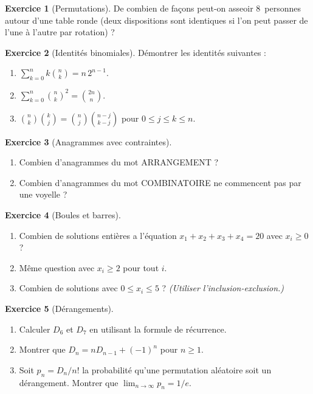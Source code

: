 \documentclass[12pt,a4paper,openany]{book}
\theoremstyle{definition}
\newtheorem{exercice}{Exercice}[chapter]
\theoremstyle{plain}
\theoremstyle{remark}
\begin{document}
\begin{exercice}[Permutations]\label{exo:permutations}
De combien de façons peut-on asseoir 8~personnes autour d'une table ronde
(deux dispositions sont identiques si l'on peut passer de l'une à l'autre
par rotation) ?
\end{exercice}

\begin{exercice}[Identités binomiales]\label{exo:identites-binom}
Démontrer les identités suivantes :
\begin{enumerate}
  \item $\displaystyle\sum_{k=0}^{n} k\binom{n}{k} = n\,2^{n-1}$.
  \item $\displaystyle\sum_{k=0}^{n} \binom{n}{k}^2 = \binom{2n}{n}$.
  \item $\displaystyle\binom{n}{k}\binom{k}{j} = \binom{n}{j}\binom{n-j}{k-j}$
    pour $0 \leq j \leq k \leq n$.
\end{enumerate}
\end{exercice}

\begin{exercice}[Anagrammes avec contraintes]\label{exo:anagrammes}
\begin{enumerate}
  \item Combien d'anagrammes du mot \textsc{ARRANGEMENT} ?
  \item Combien d'anagrammes du mot \textsc{COMBINATOIRE} ne commencent
    pas par une voyelle ?
\end{enumerate}
\end{exercice}

\begin{exercice}[Boules et barres]\label{exo:boules-barres}
\begin{enumerate}
  \item Combien de solutions entières a l'équation $x_1+x_2+x_3+x_4 = 20$
    avec $x_i \geq 0$ ?
  \item Même question avec $x_i \geq 2$ pour tout $i$.
  \item Combien de solutions avec $0 \leq x_i \leq 5$ ?
    \textit{(Utiliser l'inclusion-exclusion.)}
\end{enumerate}
\end{exercice}

\begin{exercice}[Dérangements]\label{exo:derangements}
\begin{enumerate}
  \item Calculer $D_6$ et $D_7$ en utilisant la formule de récurrence.
  \item Montrer que $D_n = nD_{n-1} + (-1)^n$ pour $n \geq 1$.
  \item Soit $p_n = D_n/n!$ la probabilité qu'une permutation aléatoire soit
    un dérangement. Montrer que $\lim_{n\to\infty} p_n = 1/e$.
\end{enumerate}
\end{exercice}
\end{document}
